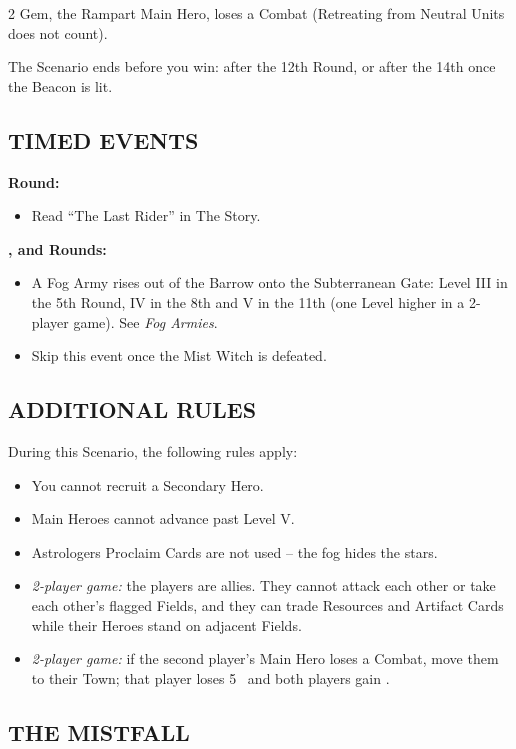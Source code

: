 \begin{multicols*}{2}
Gem, the Rampart Main Hero, loses a Combat (Retreating from Neutral Units does not count).

The Scenario ends before you win: after the 12th Round, or after the 14th once the Beacon is lit.

\subsection*{\MakeUppercase{Timed Events}}

\textbf{ Round:}
\begin{itemize}
  \item Read ``The Last Rider'' in The Story.
\end{itemize}

\textbf{,  and  Rounds:}
\begin{itemize}
  \item A Fog Army rises out of the Barrow onto the Subterranean Gate: Level III in the 5th Round, IV in the 8th and V in the 11th (one Level higher in a 2-player game). See \textit{Fog Armies}.
  \item Skip this event once the Mist Witch is defeated.
\end{itemize}

\subsection*{\MakeUppercase{Additional Rules}}

During this Scenario, the following rules apply:
\begin{itemize}
  \item You cannot recruit a Secondary Hero.
  \item Main Heroes cannot advance past Level V.
  \item Astrologers Proclaim Cards are not used -- the fog hides the stars.
  \item \textit{2-player game:} the players are allies. They cannot attack each other or take each other's flagged Fields, and they can trade Resources and Artifact Cards while their Heroes stand on adjacent Fields.
  \item \textit{2-player game:} if the second player's Main Hero loses a Combat, move them to their Town; that player loses 5~ and both players gain .
\end{itemize}

\subsection*{\MakeUppercase{The Mistfall}}


\end{multicols*}
